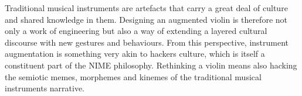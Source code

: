 Traditional musical instruments are artefacts that carry a great deal of culture and shared knowledge in them. Designing an augmented violin is therefore not only a work of engineering but also a way of extending a layered cultural discourse with new gestures and behaviours. From this perspective, instrument augmentation is something very akin to hackers culture, which is itself a constituent part of the NIME philosophy. Rethinking a violin means also hacking the semiotic memes, morphemes and kinemes of the traditional musical instruments narrative.

